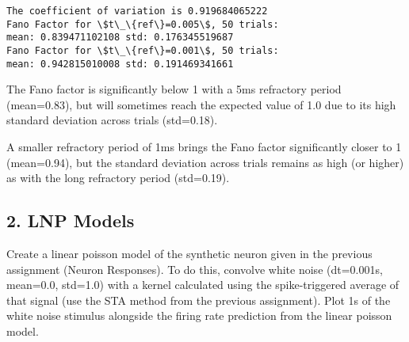 \documentclass{article}
\begin{document}
    \begin{Verbatim}[commandchars=\\\{\}]
The coefficient of variation is 0.919684065222
Fano Factor for \$t\_\{ref\}=0.005\$, 50 trials:
mean: 0.839471102108 std: 0.176345519687
Fano Factor for \$t\_\{ref\}=0.001\$, 50 trials:
mean: 0.942815010008 std: 0.191469341661
    \end{Verbatim}

    The Fano factor is significantly below 1 with a 5ms refractory period
(mean=0.83), but will sometimes reach the expected value of 1.0 due to
its high standard deviation across trials (std=0.18).

A smaller refractory period of 1ms brings the Fano factor significantly
closer to 1 (mean=0.94), but the standard deviation across trials
remains as high (or higher) as with the long refractory period
(std=0.19).

    \subsection{2. LNP Models}\label{lnp-models}

    Create a linear poisson model of the synthetic neuron given in the
previous assignment (Neuron Responses). To do this, convolve white noise
(dt=0.001s, mean=0.0, std=1.0) with a kernel calculated using the
spike-triggered average of that signal (use the STA method from the
previous assignment). Plot 1s of the white noise stimulus alongside the
firing rate prediction from the linear poisson model.
\end{document}
